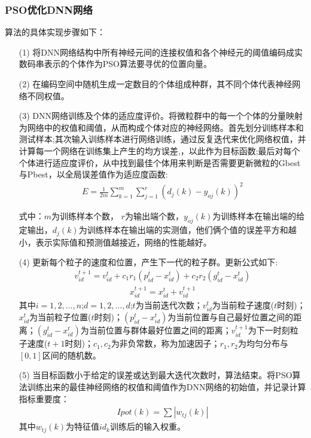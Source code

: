 \documentclass{whutmod}
\begin{document}
	
	\subsubsection{PSO优化DNN网络}
	算法的具体实现步骤如下：
	\begin{itemize}
		\item [(1)]将DNN网络结构中所有神经元间的连接权值和各个神经元的阈值编码成实数码串表示的个体作为PSO算法要寻优的位置向量。
		\item [(2)]在编码空间中随机生成一定数目的个体组成种群，其不同个体代表神经网络不同权值。
		\item [(3)]DNN网络训练及个体的适应度评价。将微粒群中的每一个个体的分量映射为网络中的权值和阈值，从而构成个体对应的神经网络。首先划分训练样本和测试样本;其次输入训练样本进行网络训练，通过反复迭代来优化网络权值，并计算每一个网络在训练集上产生的均方误差,，以此作为目标函数;最后对每个个体进行适应度评价，从中找到最佳个体用来判断是否需要更新微粒的Gbest与Pbest，以全局误差值作为适应度函数:
		\begin{gather*}
		E = \frac { 1 } { 2 m } \sum _ { k = 1 } ^ { m } \sum _ { j = 1 } ^ { r } \left( d _ { j } ( k ) - y _ { o j } ( k ) \right) ^ { 2 }
		\end{gather*}
		
		式中：$m$为训练样本个数，
		$r$为输出端个数，$y_{oj}(k)$为训练样本在输出端的给定输出，$ d _ { j } ( k ) $为训练样本在输出端的实测值，他们俩个值的误差平方和越小，表示实际值和预测值越接近，网络的性能越好。
		
		\item [(4)]更新每个粒子的速度和位置，产生下一代的粒子群。更新公式如下:
		\begin{gather}
		v_{id}^{t+1}=v_{id}^{t}+c_{1}r_{1}(p_{id}^{t}-x_{id}^{t})+c_{2}r_{2}(g_{id}^{t}-x_{id}^{t})
		\end{gather}	
		\begin{gather}
		x_{id}^{t+1}=x_{id}^{t}+v_{id}^{t+1}
		\end{gather}
		其中$i=1,2,...,n$;$d=1,2,...,d$;$t$为当前迭代次数；$v_{id}^{t}$为当前粒子速度($t$时刻)；$x_{id}^{t}$为当前粒子位置($t$时刻)；$(p_{id}^{t}-x_{id}^{t})$为当前位置与自己最好位置之间的距离；$(g_{id}^{t}-x_{id}^{t})$为当前位置与群体最好位置之间的距离；$v_{id}^{t+1}$为下一时刻粒子速度($t+1$时刻)；$c_{1},c_{2}$为非负常数，称为加速因子；$r_{1},r_{2}$为均匀分布与$[0,1]$区间的随机数。
		
		\item [(5)]当目标函数小于给定的误差或达到最大迭代次数时，算法结束。将PSO算法训练出来的最佳神经网络的权值和阈值作为DNN网络的初始值，并记录计算指标重要度：
		\begin{gather}
			Ipot(k)=\sum \left |  w _ { t j }(k)\right |
		\end{gather}
	其中$w _ { t j }(k)$为特征值$id_{k}$训练后的输入权重。
	\end{itemize}
	
\end{document}
